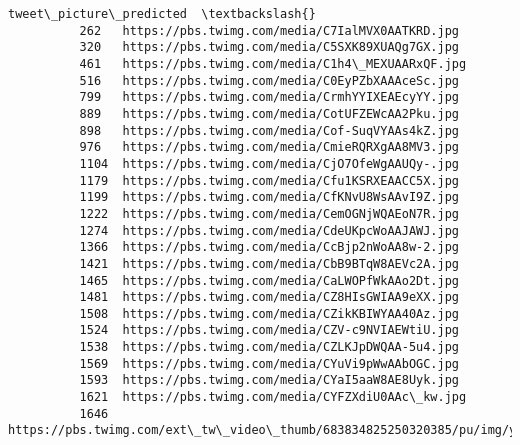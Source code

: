 \documentclass[11pt]{article}
\begin{document}
\begin{Verbatim}[commandchars=\\\{\}]
                                                                                tweet\_picture\_predicted  \textbackslash{}
          262   https://pbs.twimg.com/media/C7IalMVX0AATKRD.jpg                                           
          320   https://pbs.twimg.com/media/C5SXK89XUAQg7GX.jpg                                           
          461   https://pbs.twimg.com/media/C1h4\_MEXUAARxQF.jpg                                           
          516   https://pbs.twimg.com/media/C0EyPZbXAAAceSc.jpg                                           
          799   https://pbs.twimg.com/media/CrmhYYIXEAEcyYY.jpg                                           
          889   https://pbs.twimg.com/media/CotUFZEWcAA2Pku.jpg                                           
          898   https://pbs.twimg.com/media/Cof-SuqVYAAs4kZ.jpg                                           
          976   https://pbs.twimg.com/media/CmieRQRXgAA8MV3.jpg                                           
          1104  https://pbs.twimg.com/media/CjO7OfeWgAAUQy-.jpg                                           
          1179  https://pbs.twimg.com/media/Cfu1KSRXEAACC5X.jpg                                           
          1199  https://pbs.twimg.com/media/CfKNvU8WsAAvI9Z.jpg                                           
          1222  https://pbs.twimg.com/media/CemOGNjWQAEoN7R.jpg                                           
          1274  https://pbs.twimg.com/media/CdeUKpcWoAAJAWJ.jpg                                           
          1366  https://pbs.twimg.com/media/CcBjp2nWoAA8w-2.jpg                                           
          1421  https://pbs.twimg.com/media/CbB9BTqW8AEVc2A.jpg                                           
          1465  https://pbs.twimg.com/media/CaLWOPfWkAAo2Dt.jpg                                           
          1481  https://pbs.twimg.com/media/CZ8HIsGWIAA9eXX.jpg                                           
          1508  https://pbs.twimg.com/media/CZikKBIWYAA40Az.jpg                                           
          1524  https://pbs.twimg.com/media/CZV-c9NVIAEWtiU.jpg                                           
          1538  https://pbs.twimg.com/media/CZLKJpDWQAA-5u4.jpg                                           
          1569  https://pbs.twimg.com/media/CYuVi9pWwAAbOGC.jpg                                           
          1593  https://pbs.twimg.com/media/CYaI5aaW8AE8Uyk.jpg                                           
          1621  https://pbs.twimg.com/media/CYFZXdiU0AAc\_kw.jpg                                           
          1646  https://pbs.twimg.com/ext\_tw\_video\_thumb/683834825250320385/pu/img/yZdrqMlyky4KGOu6.jpg   

\end{Verbatim}
\end{document}
